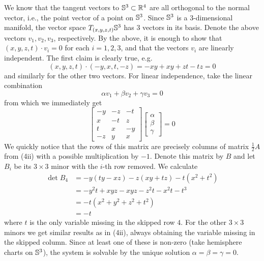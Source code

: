 \documentclass[a4paper, 12pt]{article}
\begin{document}
\begin{Exercise}
\begin{enumerate}[label=(\roman*)]
            We know that the tangent vectors to $\S^3 \subset \R^4$ are all orthogonal to the normal vector, i.e., the point vector of a point on $\S^3$.
            Since $\S^3$ is a $3$-dimensional manifold, the vector space $T_{(x, y, z, t)}\S^3$ has $3$ vectors in its basis.
            Denote the above vectors $v_1, v_2, v_3$, respectively.
            By the above, it is enough to show that $(x, y, z, t) \cdot v_i = 0$ for each $i = 1, 2, 3$, and that the vectors $v_i$ are linearly independent.
            The first claim is clearly true, e.g.
            \[
                (x,y,z,t) \cdot (-y,x,t,-z) = -xy + xy + zt - tz = 0
            \]
            and similarly for the other two vectors.
            For linear independence, take the linear combination
            \[
                \alpha v_1 + \beta v_2 + \gamma v_3 = 0
            \]
            from which we immediately get
            \[
                \begin{bmatrix}
                    -y & -z & -t \\
                    x & -t  & z \\
                    t & x   & -y \\
                    -z & y  & x
                \end{bmatrix}
                \begin{bmatrix}
                    \alpha \\
                    \beta \\
                    \gamma
                \end{bmatrix}
                = 0
            \]
            We quickly notice that the rows of this matrix are precisely columns of matrix $\frac{1}{2}A$ from (4ii) with a possible multiplication by $-1$.
            Denote this matrix by $B$ and let $B_i$ be its $3 \times 3$ minor with the $i$-th row removed.
            We calculate
            \begin{align*}
                \det B_4
                &= -y(ty - xz) - z(xy + tz) - t(x^2 + t^2) \\
                &= -y^2t + xyz - xyz - z^2t - x^2t - t^3 \\
                &= -t(x^2 + y^2 + z^2 + t^2) \\
                &= -t
            \end{align*}
            where $t$ is the only variable missing in the skipped row $4$.
            For the other $3 \times 3$ minors we get similar results as in (4ii),
            always obtaining the variable missing in the skipped column.
            Since at least one of these is non-zero (take hemisphere charts on $\S^3$),
            the system is solvable by the unique solution $\alpha = \beta = \gamma = 0$.


\end{enumerate}
\end{Exercise}
\end{document}
